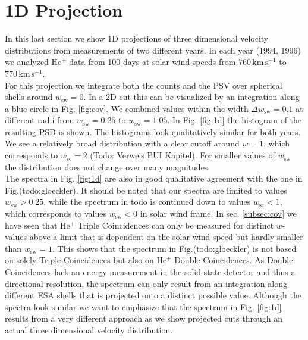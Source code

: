 \section{1D Projection}
In this last section we show 1D projections of three dimensional velocity distributions from measurements of two different years. In each year (1994, 1996) we analyzed $\mathrm{He^{+}}$ data from 100 days at solar wind speeds from $760 \, \mathrm{km\,s^{-1}}$ to $770 \, \mathrm{km\,s^{-1}}$.\\
For this projection we integrate both the counts and the PSV over spherical shells around $w_\mathrm{sw}=0$. In a 2D cut this can be visualized by an integration along a blue circle in Fig. \ref{fig:cov}. We combined values within the width $\Delta w_\mathrm{sw} = 0.1$ at different radii from $w_\mathrm{sw} = 0.25$ to $w_\mathrm{sw} = 1.05$. In Fig. \ref{fig:1d} the histogram of the resulting PSD is shown. The histograms look qualitatively similar for both years. 
We see a relatively broad distribution with a clear cutoff around $w = 1$, which corresponds to $w_\mathrm{sc} = 2$ (Todo: Verweis PUI Kapitel). For smaller values of $w_\mathrm{sw}$ the distribution does not change over many magnitudes. 
\\
The spectra in Fig. \ref{fig:1d} are also in good qualitative agreement with the one in Fig.(todo:gloeckler). It should be noted that our spectra are limited to values $w_\mathrm{sw} > 0.25$, while the spectrum in todo is continued down to values $w_\mathrm{sc} < 1$, which corresponds to values $w_\mathrm{sw} < 0$ in solar wind frame. 
In sec. \ref{subsec:cov} we have seen that $\mathrm{He^{+}}$ Triple Coincidences can only be measured for distinct $w$-values above a limit that is dependent on the solar wind speed but hardly smaller than $w_\mathrm{sw} = 1$. This shows that the spectrum in Fig.(todo:gloeckler) is not based on solely Triple Coincidences but also on $\mathrm{He^{+}}$ Double Coincidences. As Double Coincidences lack an energy measurement in the solid-state detector and thus a directional resolution, the spectrum can only result from an integration along different ESA shells that is projected onto a distinct possible value.
Although the spectra look similar we want to emphasize that the spectrum in Fig. \ref{fig:1d} results from a very different approach as we show projected cuts through an actual three dimensional velocity distribution.
